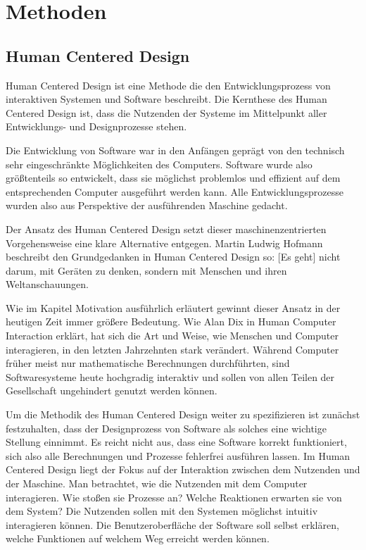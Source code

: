 \documentclass[12pt]{article}
\begin{document}
\section{Methoden}

\subsection{Human Centered Design}
Human Centered Design ist eine Methode die den Entwicklungsprozess von
interaktiven Systemen und Software beschreibt. Die Kernthese des Human Centered
Design ist, dass die Nutzenden der Systeme im Mittelpunkt aller Entwicklungs-
und Designprozesse stehen.

Die Entwicklung von Software war in den Anfängen geprägt von den technisch sehr
eingeschränkte Möglichkeiten des Computers. Software wurde also größtenteils so
entwickelt, dass sie möglichst problemlos und effizient auf dem entsprechenden
Computer ausgeführt werden kann. Alle Entwicklungsprozesse wurden also aus
Perspektive der ausführenden Maschine gedacht.

Der Ansatz des Human Centered Design setzt dieser maschinenzentrierten
Vorgehensweise eine klare Alternative entgegen. Martin Ludwig Hofmann
beschreibt den Grundgedanken in \glqq{} Human Centered Design\grqq{} so:
\glqq{} [Es geht] nicht darum, mit Geräten zu denken, sondern mit Menschen und
ihren Weltanschauungen\grqq{}. \cite{hcd}

Wie im Kapitel Motivation ausführlich erläutert gewinnt dieser Ansatz in der
heutigen Zeit immer größere Bedeutung. Wie Alan Dix in \glqq{} Human Computer
Interaction\grqq{} erklärt, hat sich die Art und Weise, wie Menschen und
Computer interagieren, in den letzten Jahrzehnten stark verändert. Während
Computer früher meist nur mathematische Berechnungen durchführten, sind
Softwaresysteme heute hochgradig interaktiv und sollen von allen Teilen der
Gesellschaft ungehindert genutzt werden können. \cite{hci}

Um die Methodik des Human Centered Design weiter zu spezifizieren ist zunächst
festzuhalten, dass der Designprozess von Software als solches eine wichtige
Stellung einnimmt. Es reicht nicht aus, dass eine Software korrekt
funktioniert, sich also alle Berechnungen und Prozesse fehlerfrei ausführen
lassen. Im Human Centered Design liegt der Fokus auf der Interaktion zwischen
dem Nutzenden und der Maschine. Man betrachtet, wie die Nutzenden mit dem
Computer interagieren. Wie stoßen sie Prozesse an? Welche Reaktionen erwarten
sie von dem System? Die Nutzenden sollen mit den Systemen möglichst intuitiv
interagieren können. Die Benutzeroberfläche der Software soll selbst erklären,
welche Funktionen auf welchem Weg erreicht werden können.
\end{document}
